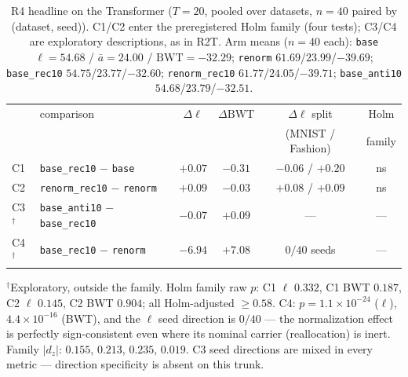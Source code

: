 \documentclass[10pt]{article}
\newcommand{\gain}{\Delta\ell}
\newcommand{\dbwt}{\Delta\mathrm{BWT}}
\begin{document}
\begin{table}[t]
\centering
\caption{R4 headline on the Transformer ($T{=}20$, pooled over datasets,
$n{=}40$ paired by (dataset, seed)). C1/C2 enter the preregistered Holm
family (four tests); C3/C4 are exploratory descriptions, as in R2T. Arm
means ($n{=}40$ each): \texttt{base} $\ell=54.68$ / $\bar{a}=24.00$ /
$\mathrm{BWT}=-32.29$; \texttt{renorm} $61.69$/$23.99$/$-39.69$;
\texttt{base\_rec10} $54.75$/$23.77$/$-32.60$;
\texttt{renorm\_rec10} $61.77$/$24.05$/$-39.71$;
\texttt{base\_anti10} $54.68$/$23.79$/$-32.51$.}
\label{tab:r4}
\small
\setlength{\tabcolsep}{4pt}
\begin{tabular}{llcccc}
\toprule
 & comparison & $\gain$ & $\dbwt$ & $\gain$ split & Holm \\
 & & & & (MNIST / Fashion) & family \\
\midrule
C1 & \texttt{base\_rec10} $-$ \texttt{base}
   & $+0.07$ & $-0.31$ & $-0.06$ / $+0.20$ & ns \\
C2 & \texttt{renorm\_rec10} $-$ \texttt{renorm}
   & $+0.09$ & $-0.03$ & $+0.08$ / $+0.09$ & ns \\
C3$^{\dagger}$ & \texttt{base\_anti10} $-$ \texttt{base\_rec10}
   & $-0.07$ & $+0.09$ & --- & --- \\
C4$^{\dagger}$ & \texttt{base\_rec10} $-$ \texttt{renorm}
   & $-6.94$ & $+7.08$ & $0/40$ seeds & --- \\
\bottomrule
\end{tabular}

\vspace{2pt}
\raggedright\footnotesize $^{\dagger}$Exploratory, outside the family.
Holm family raw $p$: C1 $\ell$ $0.332$, C1 BWT $0.187$, C2 $\ell$
$0.145$, C2 BWT $0.904$; all Holm-adjusted $\ge 0.58$. C4:
$p=1.1\times10^{-24}$ ($\ell$), $4.4\times10^{-16}$ (BWT), and the
$\ell$ seed direction is $0/40$ --- the normalization effect is perfectly
sign-consistent even where its nominal carrier (reallocation) is inert.
Family $|d_z|$: $0.155$, $0.213$, $0.235$, $0.019$. C3 seed directions
are mixed in every metric --- direction specificity is absent on this
trunk.
\end{table}
\end{document}
